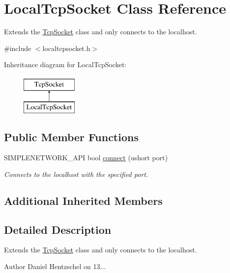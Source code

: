 \hypertarget{class_local_tcp_socket}{}\section{Local\+Tcp\+Socket Class Reference}
\label{class_local_tcp_socket}


Extends the \mbox{\hyperlink{class_tcp_socket}{Tcp\+Socket}} class and only connects to the localhost.  




{\ttfamily \#include $<$localtcpsocket.\+h$>$}

Inheritance diagram for Local\+Tcp\+Socket\+:\begin{figure}[H]
\begin{center}
\leavevmode
\includegraphics[height=2.000000cm]{class_local_tcp_socket}
\end{center}
\end{figure}
\subsection*{Public Member Functions}
\begin{DoxyCompactItemize}
\item 
S\+I\+M\+P\+L\+E\+N\+E\+T\+W\+O\+R\+K\+\_\+\+A\+PI bool \mbox{\hyperlink{class_local_tcp_socket_a3ffd411649714ba72f10a9d65f5e52ab}{connect}} (ushort port)
\begin{DoxyCompactList}\small\item\em Connects to the localhost with the specified port. \end{DoxyCompactList}\end{DoxyCompactItemize}
\subsection*{Additional Inherited Members}


\subsection{Detailed Description}
Extends the \mbox{\hyperlink{class_tcp_socket}{Tcp\+Socket}} class and only connects to the localhost. 

\begin{DoxyAuthor}{Author}
Daniel Hentzschel on 13... 
\end{DoxyAuthor}


